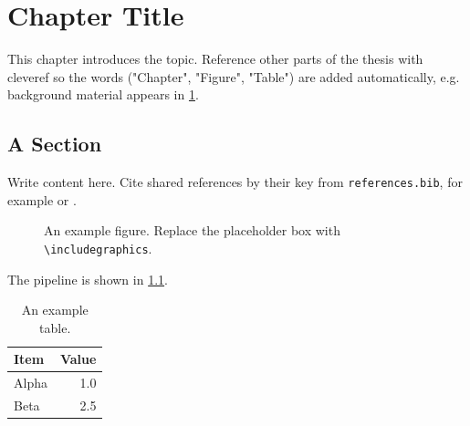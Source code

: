 %

\chapter{Chapter Title}
\label{ch:template}

This chapter introduces the topic. Reference other parts of the thesis with
cleveref so the words ("Chapter", "Figure", "Table") are added automatically,
e.g. background material appears in \cref{ch:template}.

\section{A Section}
\label{sec:template-section}

Write content here. Cite shared references by their key from
\texttt{references.bib}, for example \textcite{example2020key} or \cite{example2020key}.

\begin{figure}[ht]
  \centering
  \fbox{\rule{0pt}{3cm}\rule{6cm}{0pt}}%
  \caption{An example figure. Replace the placeholder box with \texttt{\textbackslash includegraphics}.}
  \label{fig:template-figure}
\end{figure}

The pipeline is shown in \cref{fig:template-figure}.

\begin{table}[ht]
  \centering
  \begin{tabular}{lr}
    \toprule
    Item & Value \\
    \midrule
    Alpha & 1.0 \\
    Beta  & 2.5 \\
    \bottomrule
  \end{tabular}
  \caption{An example table.}
  \label{tab:template-table}
\end{table}

